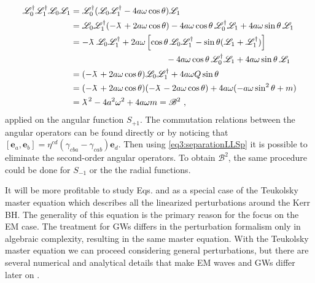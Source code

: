 \begin{align}
    \begin{split}
        \mathscr{L}^\dagger_0 \mathscr{L}^\dagger_1 \mathscr{L}_0 \mathscr{L}_1 &=
        \mathscr{L}^\dagger_0 ( \mathscr{L}_0 \mathscr{L}^\dagger_1 - 4 a\omega \cos\theta )\mathscr{L}_1 \\
        &= \mathscr{L}_0 \mathscr{L}^\dagger_1 ( - \lambdabar + 2 a\omega \cos\theta) - 4 a\omega \cos\theta \,\mathscr{L}^\dagger_0 \mathscr{L}_1 + 4 a\omega \sin\theta \,\mathscr{L}_1 \\
        &= -\lambdabar \, \mathscr{L}_0 \mathscr{L}^\dagger_1 + 2 a\omega \left[ \cos\theta \, \mathscr{L}_0 \mathscr{L}^\dagger_1 -\sin\theta(\mathscr{L}_1+\mathscr{L}^\dagger_1) \right] \\ &\mkern200mu - 4 a\omega \cos\theta \,\mathscr{L}^\dagger_0 \mathscr{L}_1 + 4 a\omega \sin\theta \,\mathscr{L}_1 \\
        &= (-\lambdabar + 2 a\omega \cos\theta ) \mathscr{L}_0 \mathscr{L}^\dagger_1 + 4 a\omega Q \sin\theta \\
        &= (-\lambdabar + 2 a\omega \cos\theta ) (-\lambdabar - 2 a\omega \cos\theta ) + 4 a\omega ( -a\omega \sin^2\theta + m ) \\
        &= \lambdabar^2 - 4 a^2 \omega^2 + 4 a \omega m = \mathscr{B}^2 ~,
    \end{split}
\end{align}
applied on the angular function $S_{+1}$.
The commutation relations between the angular operators can be found directly or by noticing that $[\bm{e}_a,\bm{e}_b]= \eta^{cd} (\gamma_{cba}-\gamma_{cab}) \bm{e}_d$.
Then using \eqref{eq3:separationLLSp} it is possible to eliminate the second-order angular operators.
To obtain $\mathscr{B}^2$, the same procedure could be done for $S_{-1}$ or the the radial functions.

It will be more profitable to study Eqs.  and  as a special case of the Teukolsky master equation \cite{Teukolsky1972} which describes all the linearized perturbations around the Kerr BH.
The generality of this equation is the primary reason for the focus on the EM case.
The treatment for GWs differs in the perturbation formalism only in algebraic complexity, resulting in the same master equation.
With the Teukolsky master equation we can proceed considering general perturbations, but there are several numerical and analytical details that make EM waves and GWs differ later on \cite{TeukolskyPress1973b}.


